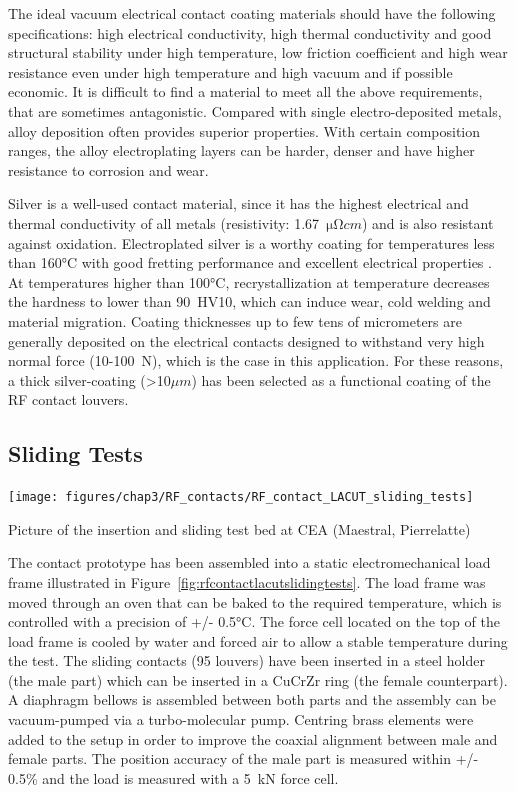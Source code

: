 {The ideal vacuum electrical contact coating materials should have the following specifications: high electrical conductivity, high thermal conductivity and good structural stability under high temperature, low friction coefficient and high wear resistance even under high temperature and high vacuum and if possible economic. It is difficult to find a material to meet all the above requirements, that are sometimes antagonistic. Compared with single electro-deposited metals, alloy deposition often provides superior properties. With certain composition ranges, the alloy electroplating layers can be harder, denser and have higher resistance to corrosion and wear. 

Silver is a well-used contact material, since it has the highest electrical and thermal conductivity of all metals (resistivity: 1.67~$\si{\micro \ohm cm}$) and is also resistant against oxidation. Electroplated silver is a worthy coating for temperatures less than 160$\si{\degreeCelsius}$ with good fretting performance and excellent electrical properties . At temperatures higher than 100$\si{\degreeCelsius}$, recrystallization at temperature decreases the hardness to lower than 90~HV10, which can induce wear, cold welding and material migration. Coating thicknesses up to few tens of micrometers are generally deposited on the electrical contacts designed to withstand very high normal force (10-100~N), which is the case in this application. For these reasons, a thick silver-coating (>10$\si{\mu m}$) has been selected as a functional coating of the RF contact louvers.

\subsection{Sliding Tests}
\begin{marginfigure}
	\centering
	\texttt{[image: figures/chap3/RF\_contacts/RF\_contact\_LACUT\_sliding\_tests]}
	\caption{Picture of the insertion and sliding test bed at CEA (Maestral, Pierrelatte)}
	\label{fig:rfcontactlacutslidingtests}
\end{marginfigure}

The contact prototype has been assembled into a static electromechanical load frame illustrated in Figure~\ref{fig:rfcontactlacutslidingtests}. The load frame was moved through an oven that can be baked to the required temperature, which is controlled with a precision of +/- 0.5$\si{\degreeCelsius}$. The force cell located on the top of the load frame is cooled by water and forced air to allow a stable temperature during the test. The sliding contacts (95 louvers) have been inserted in a steel holder (the male part) which can be inserted in a CuCrZr ring (the female counterpart). A diaphragm bellows is assembled between both parts and the assembly can be vacuum-pumped via a turbo-molecular pump. Centring brass elements were added to the setup in order to improve the coaxial alignment between male and female parts. The position accuracy of the male part is measured within +/- 0.5\% and the load is measured with a 5~kN force cell. 


}
